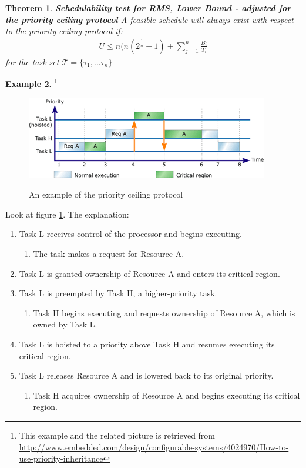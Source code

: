 \documentclass[a4paper,12pt]{article}
\newtheorem{theorem}{Theorem}[section]
\theoremstyle{definition}
\newtheorem{example}[theorem]{Example}
\newcommand{\Tau}{\mathcal{T}}
\begin{document}
\begin{theorem}\textbf{Schedulability test for RMS, Lower Bound - adjusted for the priority ceiling protocol}
A feasible schedule will always exist with respect to the priority ceiling protocol if:
  \begin{eqnarray}
  U \leq n(n(2^{\frac{1}{n}} -1) + \sum\limits_{j=1}^{n} \frac{B_i}{T_i}
  \end{eqnarray}
  for the task set $\Tau = \{\tau_1, ... \tau_n\}$
\end{theorem}\label{bound2}

\begin{example}\footnote{This example and the related picture is retrieved from \url{http://www.embedded.com/design/configurable-systems/4024970/How-to-use-priority-inheritance}}

\begin{figure}
  \centering
  \includegraphics[scale=1]{figprot.png}\\
  \caption{An example of the priority ceiling protocol}\label{figprot}
\end{figure}
Look at figure \ref{figprot}. The explanation:
 \begin{enumerate}
   \item Task L receives control of the processor and begins executing.
\begin{enumerate}
   \item The task makes a request for Resource A.
 \end{enumerate}
\item Task L is granted ownership of Resource A and enters its critical region.
\item Task L is preempted by Task H, a higher-priority task.
      \begin{enumerate}
   \item Task H begins executing and requests ownership of Resource A, which is owned by Task L.
 \end{enumerate}
\item Task L is hoisted to a priority above Task H and resumes executing its critical region.
\item Task L releases Resource A and is lowered back to its original priority.
  \begin{enumerate}
   \item Task H acquires ownership of Resource A and begins executing its critical region.
    \end{enumerate}


\end{enumerate}
\end{example}
\end{document}
